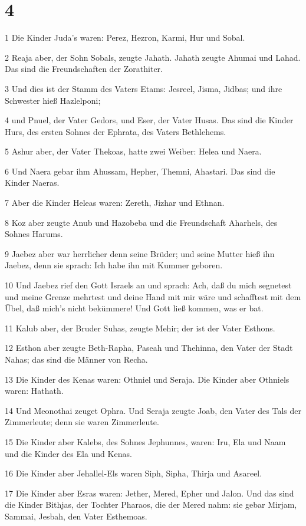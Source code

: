 \chapter{4}

\par 1 Die Kinder Juda's waren: Perez, Hezron, Karmi, Hur und Sobal.
\par 2 Reaja aber, der Sohn Sobals, zeugte Jahath. Jahath zeugte Ahumai und Lahad. Das sind die Freundschaften der Zorathiter.
\par 3 Und dies ist der Stamm des Vaters Etams: Jesreel, Jisma, Jidbas; und ihre Schwester hieß Hazlelponi;
\par 4 und Pnuel, der Vater Gedors, und Eser, der Vater Husas. Das sind die Kinder Hurs, des ersten Sohnes der Ephrata, des Vaters Bethlehems.
\par 5 Ashur aber, der Vater Thekoas, hatte zwei Weiber: Helea und Naera.
\par 6 Und Naera gebar ihm Ahussam, Hepher, Themni, Ahastari. Das sind die Kinder Naeras.
\par 7 Aber die Kinder Heleas waren: Zereth, Jizhar und Ethnan.
\par 8 Koz aber zeugte Anub und Hazobeba und die Freundschaft Aharhels, des Sohnes Harums.
\par 9 Jaebez aber war herrlicher denn seine Brüder; und seine Mutter hieß ihn Jaebez, denn sie sprach: Ich habe ihn mit Kummer geboren.
\par 10 Und Jaebez rief den Gott Israels an und sprach: Ach, daß du mich segnetest und meine Grenze mehrtest und deine Hand mit mir wäre und schafftest mit dem Übel, daß mich's nicht bekümmere! Und Gott ließ kommen, was er bat.
\par 11 Kalub aber, der Bruder Suhas, zeugte Mehir; der ist der Vater Esthons.
\par 12 Esthon aber zeugte Beth-Rapha, Paseah und Thehinna, den Vater der Stadt Nahas; das sind die Männer von Recha.
\par 13 Die Kinder des Kenas waren: Othniel und Seraja. Die Kinder aber Othniels waren: Hathath.
\par 14 Und Meonothai zeuget Ophra. Und Seraja zeugte Joab, den Vater des Tals der Zimmerleute; denn sie waren Zimmerleute.
\par 15 Die Kinder aber Kalebs, des Sohnes Jephunnes, waren: Iru, Ela und Naam und die Kinder des Ela und Kenas.
\par 16 Die Kinder aber Jehallel-Els waren Siph, Sipha, Thirja und Asareel.
\par 17 Die Kinder aber Esras waren: Jether, Mered, Epher und Jalon. Und das sind die Kinder Bithjas, der Tochter Pharaos, die der Mered nahm: sie gebar Mirjam, Sammai, Jesbah, den Vater Esthemoas.
